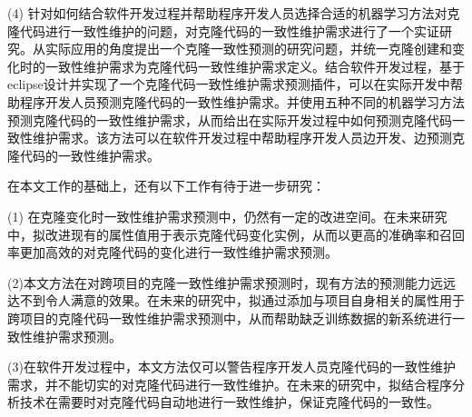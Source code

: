 (4) 针对如何结合软件开发过程并帮助程序开发人员选择合适的机器学习方法对克隆代码进行一致性维护的问题，对克隆代码的一致性维护需求进行了一个实证研究。从实际应用的角度提出一个克隆一致性预测的研究问题，并统一克隆创建和变化时的一致性维护需求为克隆代码一致性维护需求定义。结合软件开发过程，基于eclipse设计并实现了一个克隆代码一致性维护需求预测插件，可以在实际开发中帮助程序开发人员预测克隆代码的一致性维护需求。并使用五种不同的机器学习方法预测克隆代码的一致性维护需求，从而给出在实际开发过程中如何预测克隆代码一致性维护需求。该方法可以在软件开发过程中帮助程序开发人员边开发、边预测克隆代码的一致性维护需求。

在本文工作的基础上，还有以下工作有待于进一步研究：

(1) 在克隆变化时一致性维护需求预测中，仍然有一定的改进空间。在未来研究中，拟改进现有的属性值用于表示克隆代码变化实例，从而以更高的准确率和召回率更加高效的对克隆代码的变化进行一致性维护需求预测。

(2)本文方法在对跨项目的克隆一致性维护需求预测时，现有方法的预测能力远远达不到令人满意的效果。在未来的研究中，拟通过添加与项目自身相关的属性用于跨项目的克隆代码一致性维护需求预测中，从而帮助缺乏训练数据的新系统进行一致性维护需求预测。

(3)在软件开发过程中，本文方法仅可以警告程序开发人员克隆代码的一致性维护需求，并不能切实的对克隆代码进行一致性维护。在未来的研究中，拟结合程序分析技术在需要时对克隆代码自动地进行一致性维护，保证克隆代码的一致性。

